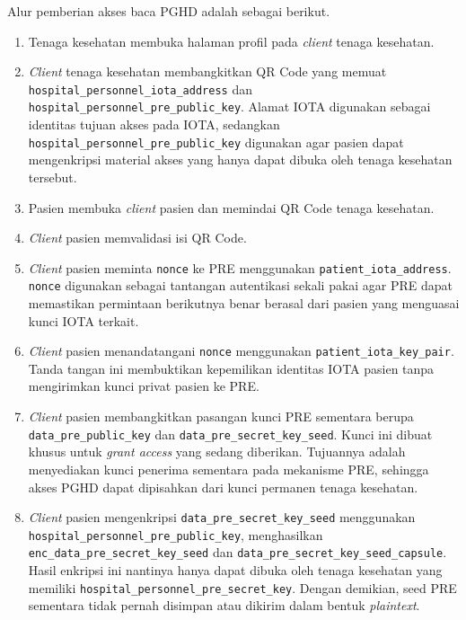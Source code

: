 Alur pemberian akses baca PGHD adalah sebagai berikut.

\begin{enumerate}
    \item Tenaga kesehatan membuka halaman profil pada \textit{client} tenaga kesehatan.

    \item \textit{Client} tenaga kesehatan membangkitkan QR Code yang memuat \texttt{hospital\_personnel\_iota\_address} dan \texttt{hospital\_personnel\_pre\_public\_key}.
    Alamat IOTA digunakan sebagai identitas tujuan akses pada IOTA, sedangkan \texttt{hospital\_personnel\_pre\_public\_key} digunakan agar pasien dapat mengenkripsi material akses yang hanya dapat dibuka oleh tenaga kesehatan tersebut.

    \item Pasien membuka \textit{client} pasien dan memindai QR Code tenaga kesehatan.

    \item \textit{Client} pasien memvalidasi isi QR Code.

    \item \textit{Client} pasien meminta \texttt{nonce} ke PRE menggunakan \texttt{patient\_iota\_address}.
    \texttt{nonce} digunakan sebagai tantangan autentikasi sekali pakai agar PRE dapat memastikan permintaan berikutnya benar berasal dari pasien yang menguasai kunci IOTA terkait.

    \item \textit{Client} pasien menandatangani \texttt{nonce} menggunakan \texttt{patient\_iota\_key\_pair}.
    Tanda tangan ini membuktikan kepemilikan identitas IOTA pasien tanpa mengirimkan kunci privat pasien ke PRE\@.

    \item \textit{Client} pasien membangkitkan pasangan kunci PRE sementara berupa \texttt{data\_pre\_public\_key} dan \texttt{data\_pre\_secret\_key\_seed}.
    Kunci ini dibuat khusus untuk \textit{grant access} yang sedang diberikan. 
    Tujuannya adalah menyediakan kunci penerima sementara pada mekanisme PRE, sehingga akses PGHD dapat dipisahkan dari kunci permanen tenaga kesehatan.

    \item \textit{Client} pasien mengenkripsi \texttt{data\_pre\_secret\_key\_seed} menggunakan \texttt{hospital\_personnel\_pre\_public\_key}, menghasilkan \texttt{enc\_\allowbreak{}data\_\allowbreak{}pre\_\allowbreak{}secret\_\allowbreak{}key\_\allowbreak{}seed} dan \texttt{data\_\allowbreak{}pre\_\allowbreak{}secret\_\allowbreak{}key\_\allowbreak{}seed\_\allowbreak{}capsule}.
    Hasil enkripsi ini nantinya hanya dapat dibuka oleh tenaga kesehatan yang memiliki \texttt{hospital\_personnel\_pre\_secret\_key}. 
    Dengan demikian, seed PRE sementara tidak pernah disimpan atau dikirim dalam bentuk \textit{plaintext}.


\end{enumerate}
